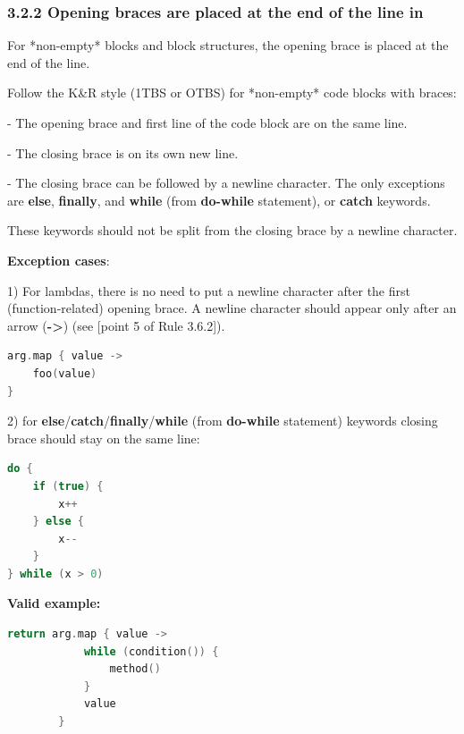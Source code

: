 {{{{{{{{{{{{{{{{\subsubsection*{\textbf{3.2.2  Opening braces are placed at the end of the line in}}
\leavevmode\newline

\label{sec:3.2.2}

For *non-empty* blocks and block structures, the opening brace is placed at the end of the line.

Follow the K\&R style (1TBS or OTBS) for *non-empty* code blocks with braces:

- The opening brace and first line of the code block are on the same line.

- The closing brace is on its own new line.

- The closing brace can be followed by a newline character. The only exceptions are \textbf{else}, \textbf{finally}, and \textbf{while} (from \textbf{do-while} statement), or \textbf{catch} keywords.

These keywords should not be split from the closing brace by a newline character.



\textbf{Exception cases}: 



1) For lambdas, there is no need to put a newline character after the first (function-related) opening brace. A newline character should appear only after an arrow (\textbf{->}) (see [point 5 of Rule 3.6.2]).



\begin{lstlisting}[language=Kotlin]
arg.map { value ->
    foo(value)
}
\end{lstlisting}


2) for \textbf{else}/\textbf{catch}/\textbf{finally}/\textbf{while} (from \textbf{do-while} statement) keywords closing brace should stay on the same line:

\begin{lstlisting}[language=Kotlin]
do {
    if (true) {
        x++
    } else {
        x--
    }
} while (x > 0) 
\end{lstlisting}
 

\textbf{Valid example:}



\begin{lstlisting}[language=Kotlin]
        return arg.map { value ->
            while (condition()) {
                method()
            }
            value 
        }


\end{lstlisting}}}}}}}}}}}}}}}}}
